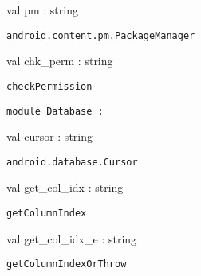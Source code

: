 \documentclass[11pt]{article}
\begin{document}
\begin{ocamldocsigend}
\begin{ocamldocsigend}
\label{val:Android.Content.PM.pm}\begin{ocamldoccode}
val pm : string
\end{ocamldoccode}
\begin{ocamldocdescription}
{\tt{android.content.pm.PackageManager}}


\end{ocamldocdescription}


\label{val:Android.Content.PM.chk-underscoreperm}\begin{ocamldoccode}
val chk_perm : string
\end{ocamldoccode}
\begin{ocamldocdescription}
{\tt{checkPermission}}


\end{ocamldocdescription}
\end{ocamldocsigend}


\end{ocamldocsigend}






\begin{ocamldoccode}
{\tt{module }}{\tt{Database}}{\tt{ : }}\end{ocamldoccode}
\label{module:Android.Database}

\begin{ocamldocsigend}


\label{val:Android.Database.cursor}\begin{ocamldoccode}
val cursor : string
\end{ocamldoccode}
\begin{ocamldocdescription}
{\tt{android.database.Cursor}}


\end{ocamldocdescription}


\label{val:Android.Database.get-underscorecol-underscoreidx}\begin{ocamldoccode}
val get_col_idx : string
\end{ocamldoccode}
\begin{ocamldocdescription}
{\tt{getColumnIndex}}


\end{ocamldocdescription}


\label{val:Android.Database.get-underscorecol-underscoreidx-underscoree}\begin{ocamldoccode}
val get_col_idx_e : string
\end{ocamldoccode}
\begin{ocamldocdescription}
{\tt{getColumnIndexOrThrow}}


\end{ocamldocdescription}
\end{ocamldocsigend}
\end{document}
